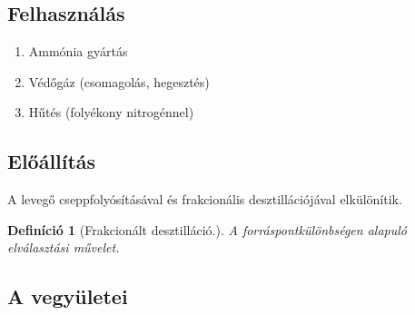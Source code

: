 \documentclass{article}
\newtheorem{definition}{Definíció}[section]
\begin{document}
\subsection{Felhasználás}
\begin{enumerate}
    \item Ammónia gyártás
    \item Védőgáz (csomagolás, hegesztés)
    \item Hűtés (folyékony nitrogénnel)

\end{enumerate}
\subsection{Előállítás} 
A levegő cseppfolyósításával és frakcionális desztillációjával elkülönítik.

\begin{definition}[Frakcionált desztilláció.]
A forráspontkülönbségen alapuló elválasztási művelet.
\end{definition}

\subsection{A vegyületei}
\end{document}
